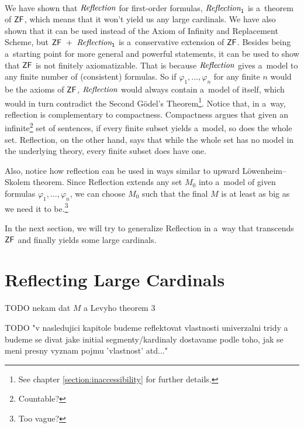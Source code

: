 \documentclass[12pt,a4paper]{article}
\begin{document}
\

We have shown that $\emph{Reflection}$ for first-order formulas, $\emph{Reflection}_1$ is a~theorem of $\sf{ZF}$, which means that it won't yield us any large cardinals. We have also shown that it can be used instead of the Axiom of Infinity and Replacement Scheme, but $\sf{ZF}\ +\ \emph{Reflection}_1$ is a~conservative extension of $\sf{ZF}$. Besides being a~starting point for more general and powerful statements, it can be used to show that $\sf{ZF}$ is not finitely axiomatizable. That is because $\emph{Reflection}$ gives a~model to any finite number of (consistent) formulas. So if $\varphi_1, \ldots, \varphi_n$ for any finite $n$ would be the axioms of $\sf{ZF}$, $\emph{Reflection}$ would always contain a~model of itself, which would in turn contradict the Second Gödel's Theorem\footnote{See chapter \ref{section:inaccessibility} for further details.}.
Notice that, in a~way, reflection is complementary to compactness. Compactness argues that given an infinite\footnote{Countable?} set of sentences, if every finite subset yields a~model, so does the whole set. Reflection, on the other hand, says that while the whole set has no model in the underlying theory, every finite subset does have one.

Also, notice how reflection can be used in ways similar to upward Löwenheim–Skolem theorem. Since Reflection extends any set $M_0$ into a~model of given formulas $\varphi_1, \ldots, \varphi_n$, we can choose $M_0$ such that the final $M$ is at least as big as we need it to be.\footnote{Too vague?}


In the next section, we will try to generalize Reflection in a~way that transcends $\sf{ZF}$ and finally yields some large cardinals.

\newpage
\section{Reflecting Large Cardinals} %

TODO nekam dat $M$ a Levyho theorem 3

TODO "v nasledujici kapitole budeme reflektovat vlastnosti univerzalni tridy a budeme se divat jake initial segmenty/kardinaly dostavame podle toho, jak se meni presny vyznam pojmu 'vlastnost' atd..."
\end{document}
